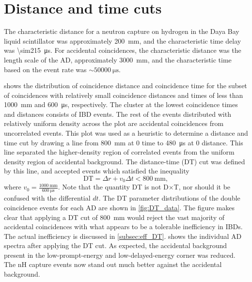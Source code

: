 \section{Distance and time cuts}
\label{sec:DT_cut}

The characteristic distance for a neutron capture on hydrogen
in the Daya Bay liquid scintillator
was approximately \SI{200}{\milli\meter},
and the characteristic time delay was \SI{\sim215}{\us}.
For accidental coincidences, the characteristic distance was
the length scale of the AD, approximately \SI{3000}{\milli\meter},
and the characteristic time based on the  event rate
was $\sim\SI{50000}{\us}$.


 shows the distribution of
coincidence distance and coincidence time
for the subset of  coincidences with
relatively small coincidence distances and times
of less than \SI{1000}{\milli\meter} and \SI{600}{\micro\second},
respectively.
The cluster at the lowest coincidence times and distances
consists of IBD events.
The rest of the events distributed with relatively uniform density
across the plot are accidental coincidences from uncorrelated events.
This plot was used as a heuristic to determine a distance and time cut
by drawing a line from \SI{800}{\milli\meter} at $0$ time
to \SI{480}{\micro\second} at $0$ distance.
This line separated the higher-density region
of correlated events from the uniform density region of accidental background.
The distance-time (DT) cut was defined by this line,
and accepted events which satisfied the inequality
\begin{equation}\label{eq:DT}
    \text{DT} = \Delta r + v_0 \Delta t < \SI{800}{\milli\meter},
\end{equation}
where $v_0 = \frac{\SI{1000}{\milli\meter}}{\SI{600}{\micro\second}}$.
Note that the quantity DT is not D$\times$T,
nor should it be confused with the differential $dt$.
The DT parameter distributions of the double coincidence events
for each AD are shown in \cref{fig:DT_data}.
The figure makes clear that applying a DT cut of \SI{800}{\mm}
would reject the vast majority of accidental coincidences
with what appears to be a tolerable inefficiency in IBDs.
The actual inefficiency is discussed in \cref{subsec:eff_DT}.
 shows the individual AD spectra
after applying the DT cut.
As expected, the accidental background present
in the low-prompt-energy and low-delayed-energy corner was reduced.
The nH capture events now stand out much better
against the accidental background.

